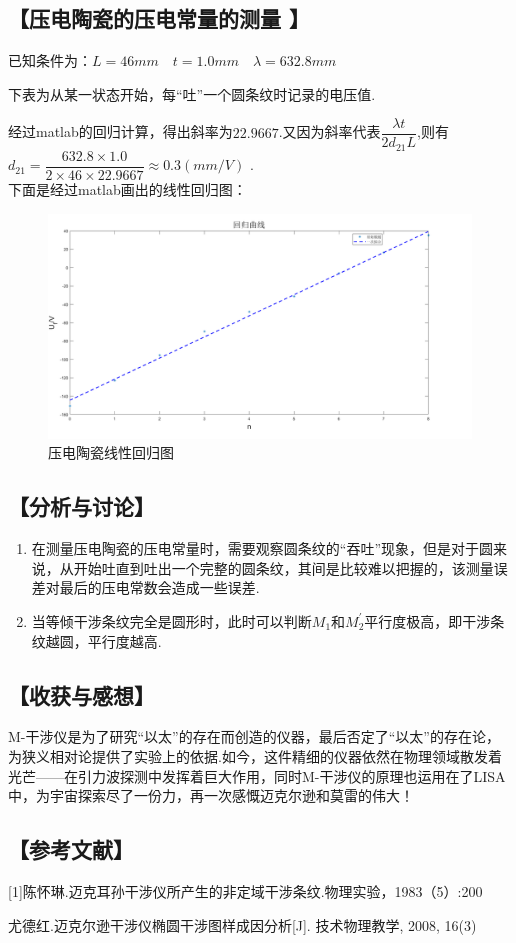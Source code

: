 \documentclass[12pt,a4paper,UTF8]{ctexart}
\begin{document}
\subsection*{【压电陶瓷的压电常量的测量 】}	
已知条件为：$L=46mm\quad t=1.0mm\quad\lambda=632.8mm$\par
下表为从某一状态开始，每“吐”一个圆条纹时记录的电压值.\par
\begin{table}[htbp]
\centering
{}
\end{table}
经过matlab的回归计算，得出斜率为$22.9667$.又因为斜率代表$\dfrac{\lambda t}{2d_{21}L}$,则有$d_{21}=\dfrac{632.8\times1.0}{2\times46\times22.9667}\approx 0.3(mm/V)$	.\\
\newpage
下面是经过matlab画出的线性回归图：
\begin{figure}[htbp]
\centering
\includegraphics[width=18cm]{huigui.png}
\caption{压电陶瓷线性回归图}
\end{figure}
\subsection*{【分析与讨论】}
\begin{enumerate}[(1)]
\item 在测量压电陶瓷的压电常量时，需要观察圆条纹的“吞吐”现象，但是对于圆来说，从开始吐直到吐出一个完整的圆条纹，其间是比较难以把握的，该测量误差对最后的压电常数会造成一些误差.
\item 当等倾干涉条纹完全是圆形时，此时可以判断$M_1$和$M_2^{\prime}$平行度极高，即干涉条纹越圆，平行度越高.
\end{enumerate}
\subsection*{【收获与感想】}
M-干涉仪是为了研究“以太”的存在而创造的仪器，最后否定了“以太”的存在论，为狭义相对论提供了实验上的依据.如今，这件精细的仪器依然在物理领域散发着光芒——在引力波探测中发挥着巨大作用，同时M-干涉仪的原理也运用在了LISA中，为宇宙探索尽了一份力，再一次感慨迈克尔逊和莫雷的伟大！
\newpage
\subsection*{【参考文献】}
[1]陈怀琳.迈克耳孙干涉仪所产生的非定域干涉条纹.物理实验，1983（5）:200 \par
[2]尤德红.迈克尔逊干涉仪椭圆干涉图样成因分析[J]. 技术物理教学, 2008, 16(3)
	
	
	
	
\end{document}
